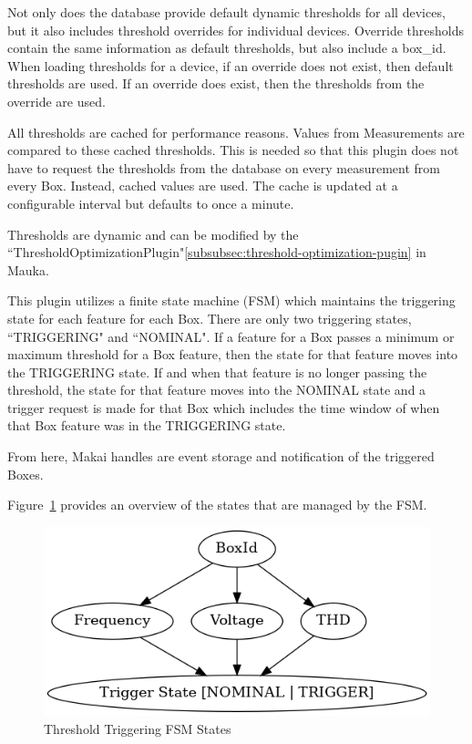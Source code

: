 Not only does the database provide default dynamic thresholds for all devices, but it also includes threshold overrides for individual devices. Override thresholds contain the same information as default thresholds, but also include a box\_id. When loading thresholds for a device, if an override does not exist, then default thresholds are used. If an override does exist, then the thresholds from the override are used.

All thresholds are cached for performance reasons. Values from Measurements are compared to these cached thresholds. This is needed so that this plugin does not have to request the thresholds from the database on every measurement from every Box. Instead, cached values are used. The cache is updated at a configurable interval but defaults to once a minute.

Thresholds are dynamic and can be modified by the ``ThresholdOptimizationPlugin"\ref{subsubsec:threshold-optimization-pugin} in Mauka.

This plugin utilizes a finite state machine (FSM) which maintains the triggering state for each feature for each Box. There are only two triggering states, ``TRIGGERING" and ``NOMINAL". If a feature for a Box passes a minimum or maximum threshold for a Box feature, then the state for that feature moves into the TRIGGERING state. If and when that feature is no longer passing the threshold, the state for that feature moves into the NOMINAL state and a trigger request is made for that Box which includes the time window of when that Box feature was in the TRIGGERING state.

From here, Makai handles are event storage and notification of the triggered Boxes.

Figure~\ref{fig:threshold_triggering} provides an overview of the states that are managed by the FSM\@.

\begin{figure}
	\centering
	\includegraphics[width=\linewidth]{figures/threshold_triggering.png}
	\caption{Threshold Triggering FSM States}
	\label{fig:threshold_triggering}
\end{figure}

